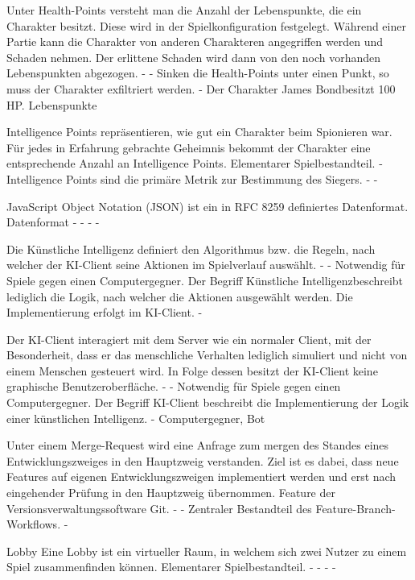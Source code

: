 {Unter Health-Points versteht man die Anzahl der Lebenspunkte, die ein Charakter besitzt. Diese wird in der Spielkonfiguration festgelegt. Während einer Partie kann die Charakter von anderen Charakteren angegriffen werden und Schaden nehmen. Der erlittene Schaden wird dann von den noch vorhanden Lebenspunkten abgezogen.}
{-}
{-}
{Sinken die Health-Points unter einen Punkt, so muss der Charakter exfiltriert werden.}
{-}
{Der Charakter \glqq James Bond\grqq besitzt 100 HP.}
{Lebenspunkte}

{Intelligence Points repräsentieren, wie gut ein Charakter beim Spionieren war. Für jedes in Erfahrung gebrachte Geheimnis bekommt der Charakter eine entsprechende Anzahl an Intelligence Points.}
{Elementarer Spielbestandteil.}
{-}
{Intelligence Points sind die primäre Metrik zur Bestimmung des Siegers.}
{-}
{-}

{JavaScript Object Notation (JSON) ist ein in RFC 8259 definiertes Datenformat.}
{Datenformat}
{-}
{-}
{-}
{-}

{Die Künstliche Intelligenz definiert den Algorithmus bzw. die Regeln, nach welcher der KI-Client seine Aktionen im Spielverlauf auswählt.}
{-}
{-}
{Notwendig für Spiele gegen einen Computergegner.}
{Der Begriff \glqq Künstliche Intelligenz\grqq beschreibt lediglich die Logik, nach welcher die Aktionen ausgewählt werden. Die Implementierung erfolgt im KI-Client.}
{-}

{Der KI-Client interagiert mit dem Server wie ein normaler Client, mit der Besonderheit, dass er das menschliche Verhalten lediglich simuliert und nicht von einem Menschen gesteuert wird. In Folge dessen besitzt der KI-Client keine graphische Benutzeroberfläche. }
{-}
{-}
{Notwendig für Spiele gegen einen Computergegner.}
{Der Begriff KI-Client beschreibt die Implementierung der Logik einer künstlichen Intelligenz.}
{-}
{Computergegner, Bot}

{Unter einem Merge-Request wird eine Anfrage zum \glqq mergen \grqq des Standes eines Entwicklungszweiges in den Hauptzweig verstanden. Ziel ist es dabei, dass neue Features auf eigenen Entwicklungszweigen implementiert werden und erst nach eingehender Prüfung in den Hauptzweig übernommen.}
{Feature der Versionsverwaltungssoftware Git.}
{-}
{-}
{Zentraler Bestandteil des Feature-Branch-Workflows.}
{-}

\Fachwissen
{Lobby}
{Eine Lobby ist ein virtueller Raum, in welchem sich zwei Nutzer zu einem Spiel zusammenfinden können.}
{Elementarer Spielbestandteil.}
{-}
{-}
{-}
{-}

